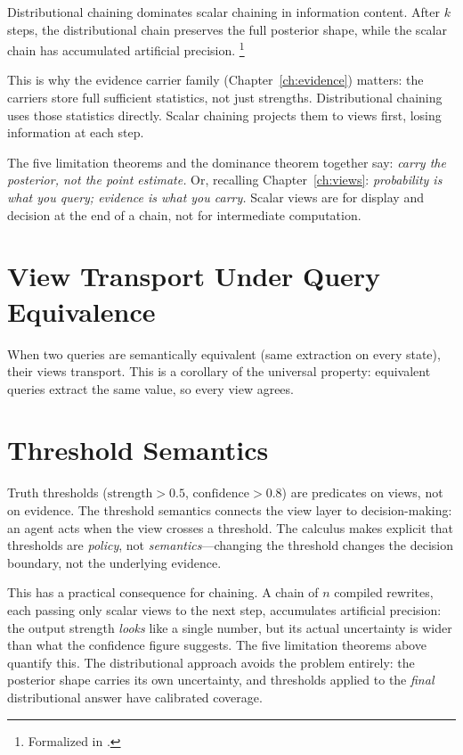 \documentclass[11pt,openany]{report}
\begin{document}
\begin{theorem}
Distributional chaining dominates scalar chaining in information
content.  After $k$ steps, the distributional chain preserves the
full posterior shape, while the scalar chain has accumulated artificial
precision.%
\footnote{Formalized in
.}
\end{theorem}

\noindent
This is why the evidence carrier family (Chapter~\ref{ch:evidence})
matters: the carriers store full sufficient statistics, not just
strengths.  Distributional chaining uses those statistics directly.
Scalar chaining projects them to views first, losing information at
each step.

The five limitation theorems and the dominance theorem together say:
\emph{carry the posterior, not the point estimate.}  Or, recalling
Chapter~\ref{ch:views}: \emph{probability is what you query;
evidence is what you carry.}  Scalar views are for display and
decision at the end of a chain, not for intermediate computation.

\section{View Transport Under Query Equivalence}

When two queries are semantically equivalent (same extraction on
every state), their views transport.  This is a corollary of the
universal property: equivalent queries extract the same value, so
every view agrees.

\section{Threshold Semantics}

Truth thresholds ($\mathrm{strength} > 0.5$,
$\mathrm{confidence} > 0.8$) are predicates on views, not on
evidence.  The threshold semantics connects the view layer to
decision-making: an agent acts when the view crosses a threshold.
The calculus makes explicit that thresholds are \emph{policy}, not
\emph{semantics}---changing the threshold changes the decision
boundary, not the underlying evidence.

This has a practical consequence for chaining.  A chain of $n$
compiled rewrites, each passing only scalar views to the next step,
accumulates artificial precision: the output strength \emph{looks}
like a single number, but its actual uncertainty is wider than
what the confidence figure suggests.  The five limitation theorems
above quantify this.  The distributional approach avoids the
problem entirely: the posterior shape carries its own uncertainty,
and thresholds applied to the \emph{final} distributional answer
have calibrated coverage.
\end{document}
